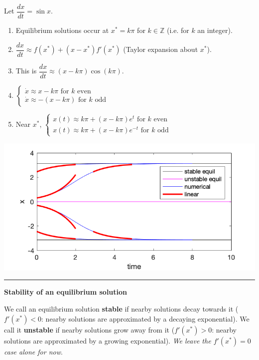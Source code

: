 \documentclass[12pt,letterpaper,noanswers]{exam}
\begin{document}
Let $\dfrac{dx}{dt} = \sin x$.  
\begin{enumerate}
    \item Equilibrium solutions occur at $x^* = k\pi$ for $k\in \mathbb{Z}$ (i.e. for $k$ an integer).
    \item $\dfrac{dx}{dt} \approx f(x^*) + (x-x^*)f'(x^*)$ (Taylor expansion about $x^*$).
    \item This is $\dfrac{dx}{dt}\approx (x-k\pi)\cos(k\pi)$.
    \item $\left\{\begin{array}{l} \dot{x} \approx x - k\pi \text{ for }k\text{ even } \\\dot{x} \approx -(x - k\pi) \text{ for }k\text{ odd } \end{array}
    \right.$
    \item Near $x^*$, 
    $\left\{\begin{array}{l} x(t) \approx k\pi + (x-k\pi)e^t \text{ for }k\text{ even } \\ x(t) \approx k\pi + (x-k\pi)e^{-t} \text{ for }k\text{ odd } \end{array}
    \right.$
\end{enumerate}

\includegraphics[scale=0.3]{img/C31p1.png}

    \vspace{0.2cm}
\hrule
\vspace{0.2cm}

\noindent\textbf{Stability of an equilibrium solution}
\begin{tcolorbox}
We call an equilibrium solution \textbf{stable} if nearby solutions decay towards it ($f'(x^*)<0$: nearby solutions are approximated by a decaying exponential).  We call it \textbf{unstable} if nearby solutions grow away from it ($f'(x^*)>0$: nearby solutions are approximated by a growing exponential).  \emph{We leave the $f'(x^*) = 0$ case alone for now}.
\end{tcolorbox}
\end{document}
